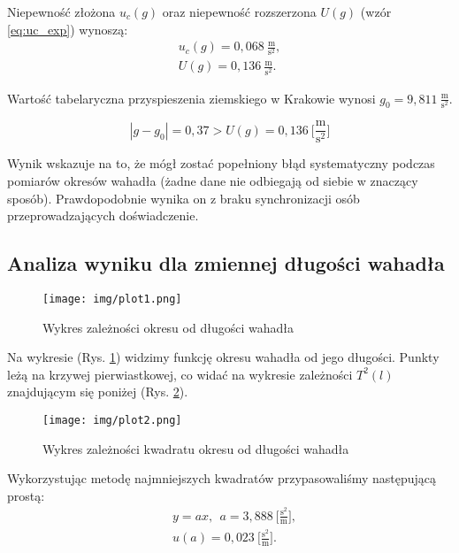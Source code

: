 \documentclass[12pt,a4paper]{article}
\numberwithin{equation}{section}
\begin{document}
Niepewność złożona $u_c(g)$ oraz niepewność rozszerzona $U(g)$ (wzór \ref{eq:uc_exp}) wynoszą:
\begin{align}
	u_c(g) = 0,068~\frac{\textrm{m}}{\textrm{s}^2},\\
	U(g) = 0,136~\frac{\textrm{m}}{\textrm{s}^2}.
\end{align}

Wartość tabelaryczna przyspieszenia ziemskiego w Krakowie wynosi $g_0 = 9,811~\frac{\textrm{m}}{\textrm{s}^2}$.

\begin{equation}
	|g - g_0| = 0,37 > U(g) = 0,136~\Big[\frac{\textrm{m}}{\textrm{s}^2}\Big]
	\label{eq:gconst}
\end{equation}

Wynik wskazuje na to, że mógł zostać popełniony błąd systematyczny podczas pomiarów okresów wahadła (żadne dane nie odbiegają od siebie w znaczący sposób). Prawdopodobnie wynika on z braku synchronizacji osób przeprowadzających doświadczenie.

\pagebreak
\subsection{Analiza wyniku dla zmiennej długości wahadła}
\begin{figure}[!ht]
	\centering
	\texttt{[image: img/plot1.png]} 
	\caption{Wykres zależności okresu od długości wahadła}
	\label{fig:img2}
\end{figure}

Na wykresie (Rys. \ref{fig:img2}) widzimy funkcję okresu wahadła od jego długości. Punkty leżą na krzywej pierwiastkowej, co widać na wykresie zależności $T^2(l)$ znajdującym się poniżej (Rys. \ref{fig:img3}).


\begin{figure}[!ht]
	\centering
	\texttt{[image: img/plot2.png]} 
	\caption{Wykres zależności kwadratu okresu od długości wahadła}
	\label{fig:img3}
\end{figure}


Wykorzystując metodę najmniejszych kwadratów przypasowaliśmy następującą prostą:
\begin{equation}
	\begin{split}
	&y = ax,~~ a = 3,888~\Big[\frac{\textrm{s}^2}{\textrm{m}}\Big],\\ 
	&u(a) = 0,023~\Big[\frac{\textrm{s}^2}{\textrm{m}}\Big].
	\end{split}
\end{equation}
\end{document}
